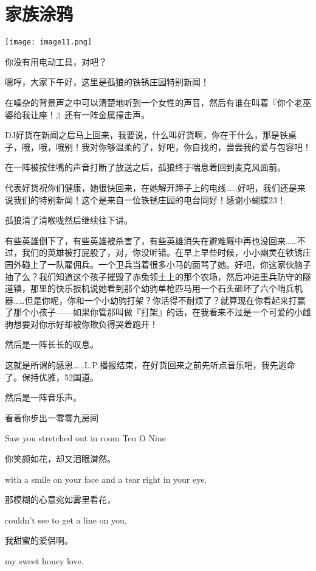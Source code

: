 \chapter{家族涂鸦}

\texttt{[image: image11.png]}

\begin{intro}
你没有用电动工具，对吧？
\end{intro}


{\rt 嗯哼，大家下午好，这里是孤狼的铁锈庄园特别新闻！}

在噪杂的背景声之中可以清楚地听到一个女性的声音，然后有谁在叫着『你个老巫婆给我让座！』还有一阵金属撞击声。

{\rt DJ好货在新闻之后马上回来，我要说，什么叫好货啊，你在干什么，那是铁桌子，哦，哦，哦别！我对你够温柔的了，好吧，你自找的，尝尝我的爱与包容吧！}

在一阵被按住嘴的声音打断了放送之后，孤狼终于喘息着回到麦克风面前。

{\rt 代表好货祝你们健康，她很快回来，在她解开蹄子上的电线……好吧，我们还是来说我们的特别新闻！这个是来自一位铁锈庄园的电台同好！感谢小蝴蝶23！}

孤狼清了清喉咙然后继续往下讲。

{\rt 有些英雄倒下了，有些英雄被杀害了，有些英雄消失在避难厩中再也没回来……不过，我们的英雄被打屁股了，对，你没听错。在早上早些时候，小小幽灵在铁锈庄园外碰上了一队雇佣兵。一个卫兵当着很多小马的面骂了她。好吧，你这家伙脑子抽了么？我们知道这个孩子摧毁了赤兔领土上的那个农场，然后冲进重兵防守的隧道镇，那里的快乐扳机说她看到那个幼驹单枪匹马用一个石头砸坏了六个哨兵机器……但是你呢，你和一个小幼驹打架？你活得不耐烦了？就算现在你看起来打赢了那个小孩子——如果你管那叫做『打架』的话，在我看来不过是一个可爱的小雌驹想要对你示好却被你欺负得哭着跑开！}

然后是一阵长长的叹息。

{\rt 这就是所谓的感恩……L.P.播报结束，在好货回来之前先听点音乐吧，我先逃命了。保持优雅，52国道。}

然后是一阵音乐声。

\begin{song}
看着你步出一零零九房间

Saw you stretched out in room Ten O Nine

\medskip

你笑颜如花，却又泪眼潸然。

with a smile on your face and a tear right in your eye.

\medskip

那模糊的心意宛如雾里看花，

couldn't see to get a line on you,

\medskip

我甜蜜的爱侣啊。

my sweet honey love.
\end{song}

